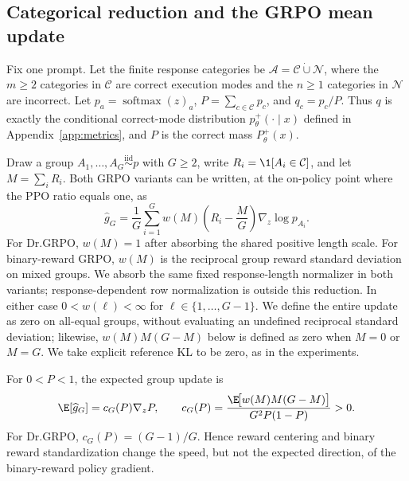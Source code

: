 \subsection{Categorical reduction and the GRPO mean update}
\label{app:theory-grpo-mean}

Fix one prompt. Let the finite response categories be
$\mathcal A=\mathcal C\mathbin{\dot\cup}\mathcal N$, where the $m\ge2$
categories in $\mathcal C$ are correct execution modes and the $n\ge1$
categories in $\mathcal N$ are incorrect. Let
$p_a=\operatorname{softmax}(z)_a$, $P=\sum_{c\in\mathcal C}p_c$, and
$q_c=p_c/P$. Thus $q$ is exactly the conditional correct-mode distribution
$p_\theta^+(\cdot\mid x)$ defined in Appendix~\ref{app:metrics}, and $P$ is the correct
mass $P_\theta^+(x)$.

Draw a group $A_1,\ldots,A_G\stackrel{\mathrm{iid}}{\sim}p$ with $G\ge2$,
write $R_i=\1[A_i\in\mathcal C]$, and let $M=\sum_iR_i$. Both GRPO variants
can be written, at the on-policy point where the PPO ratio equals one, as
\begin{equation}
  \widehat g_G
  =\frac1G\sum_{i=1}^G
   w(M)\left(R_i-\frac{M}{G}\right)\nabla_z\log p_{A_i}.
  \label{eq:group-estimator}
\end{equation}
For Dr.GRPO, $w(M)=1$ after absorbing the shared positive length scale. For
binary-reward GRPO, $w(M)$ is the reciprocal group reward standard deviation
on mixed groups. We absorb the same fixed response-length normalizer in both
variants; response-dependent row normalization is outside this reduction.
In either case $0<w(\ell)<\infty$ for $\ell\in\{1,\ldots,G-1\}$.
We define the entire update as zero on all-equal groups, without evaluating an
undefined reciprocal standard deviation; likewise, $w(M)M(G-M)$ below is
defined as zero when $M=0$ or $M=G$. We take explicit reference KL to be zero, as
in the experiments.

\begin{lemma}
\label{lem:grpo-mean}
For $0<P<1$, the expected group update is
\begin{equation}
  \E[\widehat g_G]
  =c_G(P)\nabla_z P,
  \qquad
  c_G(P)=
  \frac{\E\!\big[w(M)M(G-M)\big]}{G^2P(1-P)}>0.
  \label{eq:expected-group-gradient}
\end{equation}
For Dr.GRPO, $c_G(P)=(G-1)/G$. Hence reward centering and binary reward
standardization change the speed, but not the expected direction, of the
binary-reward policy gradient.
\end{lemma}

